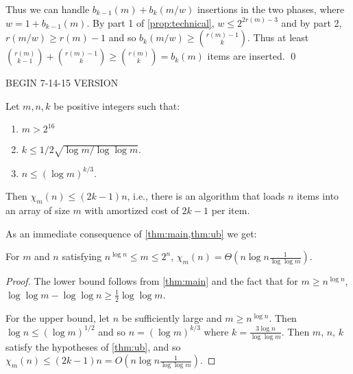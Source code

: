 \documentclass[unicode,review]{siamart1116}
\newenvironment{proofof}[1]{\noindent{\textbf { Proof of #1:}}} {{\qed}}
\numberwithin{theorem}{section}
\begin{document}
\begin{proofof}{\Cref{thm:ub}}
Thus we can handle $b_{k-1}(m)+b_k(m/w)$ insertions in the two phases, where $w=1+b_{k-1}(m)$.  
By part 1 of \cref{prop:technical}, $w \leq 2^{2r(m)-3}$ and by part 2,
$r(m/w) \geq r(m)-1$ and so $b_k(m/w) \geq \binom{r(m)-1}{k}$.
Thus  at least $\binom{r(m)}{k-1}+\binom{r(m)-1}{k} \geq \binom{r(m)}{k}=b_k(m)$
items are inserted.
\end{proofof}

\iffalse
BEGIN 7-14-15 VERSION
\begin{theorem}
\label{thm:ub}
Let $m,n,k$ be positive integers such that:
\begin{enumerate}
\item $m>2^{16}$
\item $k\leq 1/2\sqrt{\log m/\log \log m}$.  
\item  $n \leq (\log m)^{k/3}$.
\end{enumerate}
Then $\chi_m(n) \leq (2k-1)n$, i.e., there is an algorithm that loads $n$ items into an array of size $m$ with amortized cost of $2k-1$ per item. 
\end{theorem}                  

As an immediate consequence of \cref{thm:main,thm:ub} we get:

\begin{corollary}
For $m$ and $n$ satisfying $n^{\log n}\leq m \leq 2^n$, $\chi_m(n) = \Theta(n \log n \frac{1}{\log\log m})$.
\end{corollary}

\begin{proof}
The lower bound follows from \cref{thm:main} and the fact that for $m \geq n^{\log n}$, $\log\log m - \log\log n \geq \frac{1}{2} \log\log m$.

For the upper bound, let
$n$ be sufficiently large and $m \geq n^{\log n}$.  Then $\log n \leq (\log m)^{1/2}$ and so $n = (\log m)^{k/3}$ where $k =\frac{3\log n}{\log\log m} $.
Then $m$, $n$, $k$ satisfy the hypotheses of \cref{thm:ub}, and so $\chi_m(n) \leq (2k-1) n = O(n \log n \frac{1}{\log\log m})$. 
\end{proof}
\end{document}
